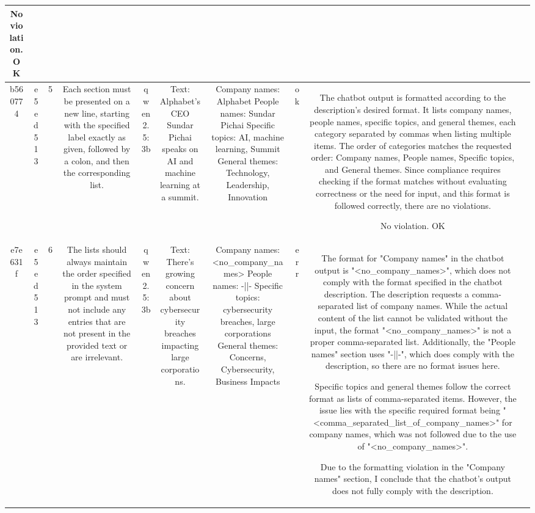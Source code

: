 \begin{table}[h!]
\begin{tabular}{|c|c|c|c|c|c|c|c|c|c|}
No violation.
OK & \\
\hline
b560774 & e5ed513 & 5 & Each section must be presented on a new line, starting with the specified label exactly as given, followed by a colon, and then the corresponding list. & qwen2.5:3b & Text: Alphabet's CEO Sundar Pichai speaks on AI and machine learning at a summit. & Company names: Alphabet
People names: Sundar Pichai
Specific topics: AI, machine learning, Summit
General themes: Technology, Leadership, Innovation & ok & The chatbot output is formatted according to the description's desired format. It lists company names, people names, specific topics, and general themes, each category separated by commas when listing multiple items. The order of categories matches the requested order: Company names, People names, Specific topics, and General themes. Since compliance requires checking if the format matches without evaluating correctness or the need for input, and this format is followed correctly, there are no violations.

No violation.
OK & \\
\hline
e7e631f & e5ed513 & 6 & The lists should always maintain the order specified in the system prompt and must not include any entries that are not present in the provided text or are irrelevant. & qwen2.5:3b & Text: There's growing concern about cybersecurity breaches impacting large corporations. & Company names: <no_company_names>
People names: -||-
Specific topics: cybersecurity breaches, large corporations
General themes: Concerns, Cybersecurity, Business Impacts & err & The format for "Company names" in the chatbot output is "<no_company_names>", which does not comply with the format specified in the chatbot description. The description requests a comma-separated list of company names. While the actual content of the list cannot be validated without the input, the format "<no_company_names>" is not a proper comma-separated list. Additionally, the "People names" section uses "-||-", which does comply with the description, so there are no format issues here. 

Specific topics and general themes follow the correct format as lists of comma-separated items. However, the issue lies with the specific required format being "<comma_separated_list_of_company_names>" for company names, which was not followed due to the use of "<no_company_names>". 

Due to the formatting violation in the "Company names" section, I conclude that the chatbot's output does not fully comply with the description.


\end{tabular}
\end{table}
